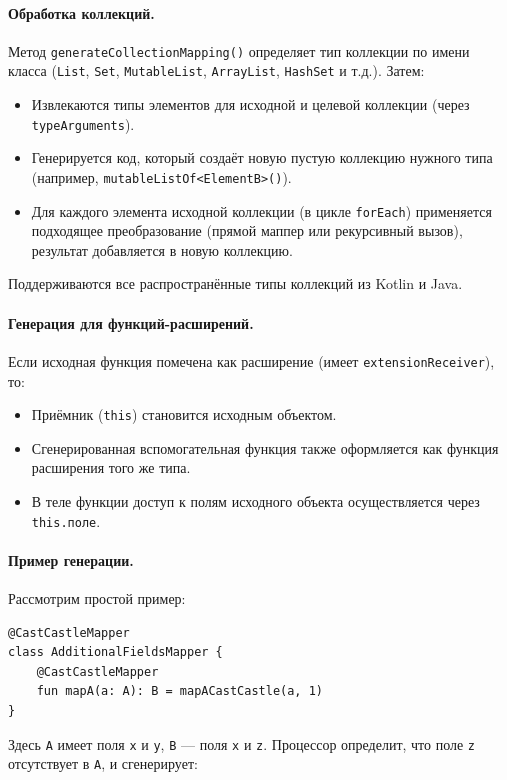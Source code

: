 \paragraph{Обработка коллекций.}
Метод \texttt{generateCollectionMapping()} определяет тип коллекции по имени класса (\texttt{List}, \texttt{Set}, \texttt{MutableList}, \texttt{ArrayList}, \texttt{HashSet} и т.д.). Затем:
\begin{itemize}
    \item Извлекаются типы элементов для исходной и целевой коллекции (через \texttt{typeArguments}).
    \item Генерируется код, который создаёт новую пустую коллекцию нужного типа (например, \texttt{mutableListOf<ElementB>()}).
    \item Для каждого элемента исходной коллекции (в цикле \texttt{forEach}) применяется подходящее преобразование (прямой маппер или рекурсивный вызов), результат добавляется в новую коллекцию.
\end{itemize}
Поддерживаются все распространённые типы коллекций из Kotlin и Java.

\paragraph{Генерация для функций-расширений.}
Если исходная функция помечена как расширение (имеет \texttt{extensionReceiver}), то:
\begin{itemize}
    \item Приёмник (\texttt{this}) становится исходным объектом.
    \item Сгенерированная вспомогательная функция также оформляется как функция расширения того же типа.
    \item В теле функции доступ к полям исходного объекта осуществляется через \texttt{this.поле}.
\end{itemize}

\paragraph{Пример генерации.}
Рассмотрим простой пример:

\begin{lstlisting}
@CastCastleMapper
class AdditionalFieldsMapper {
    @CastCastleMapper
    fun mapA(a: A): B = mapACastCastle(a, 1)
}
\end{lstlisting}
Здесь \texttt{A} имеет поля \texttt{x} и \texttt{y}, \texttt{B} — поля \texttt{x} и \texttt{z}. Процессор определит, что поле \texttt{z} отсутствует в \texttt{A}, и сгенерирует:

